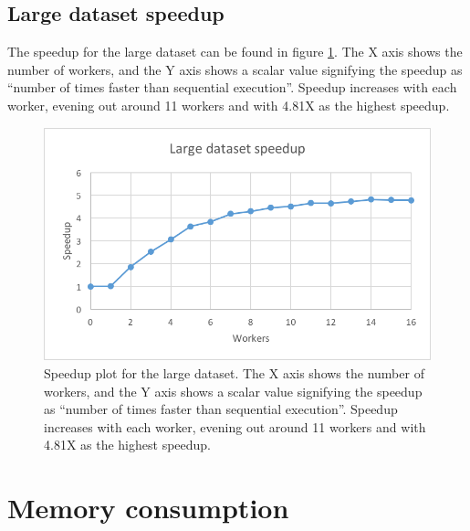 \subsection{Large dataset speedup}
The speedup for the large dataset can be found in figure \ref{fig:dataset_4_speedup}.
The X axis shows the number of workers, and the Y axis shows a scalar value signifying the speedup as
``number of times faster than sequential execution''. Speedup increases with each worker, evening out around 11 workers and with 4.81X as the highest speedup.
\begin{figure}[ht]
  \centering
  \includegraphics[width=120mm]{figures/dataset_4/dataset_4_speedup.png}
  \caption[Speedup plot for the large dataset.]{Speedup plot for the large dataset. The X axis shows the number of workers, and the Y axis shows a scalar value signifying the speedup as
  ``number of times faster than sequential execution''. Speedup increases with each worker, evening out around 11 workers and with 4.81X as the highest speedup.}
  \label{fig:dataset_4_speedup}
\end{figure}

\section{Memory consumption}

